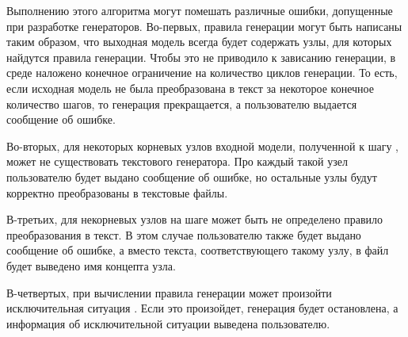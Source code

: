 Выполнению этого алгоритма могут помешать различные ошибки, допущенные при разработке генераторов. Во-первых, правила генерации могут быть написаны таким образом, что выходная модель всегда будет содержать узлы, для которых найдутся правила генерации. Чтобы это не приводило к зависанию генерации, в среде \MPS{} наложено конечное ограничение на количество циклов генерации. То есть, если исходная модель не была преобразована в текст за некоторое конечное количество шагов, то генерация прекращается,  а пользователю выдается сообщение об ошибке.

Во-вторых, для некоторых корневых узлов входной модели, полученной к шагу , может не существовать текстового генератора. Про каждый такой узел пользователю будет выдано сообщение об ошибке, но остальные узлы будут корректно преобразованы в текстовые файлы.

В-третьих, для некорневых узлов на шаге  может быть не определено правило преобразования в текст. В этом случае пользователю также будет выдано сообщение об ошибке, а вместо текста, соответствующего такому узлу, в файл будет выведено имя концепта узла.

В-четвертых, при вычислении правила генерации может произойти исключительная ситуация \cite{eckel}. Если это произойдет, генерация будет остановлена, а информация об исключительной ситуации выведена пользователю.
